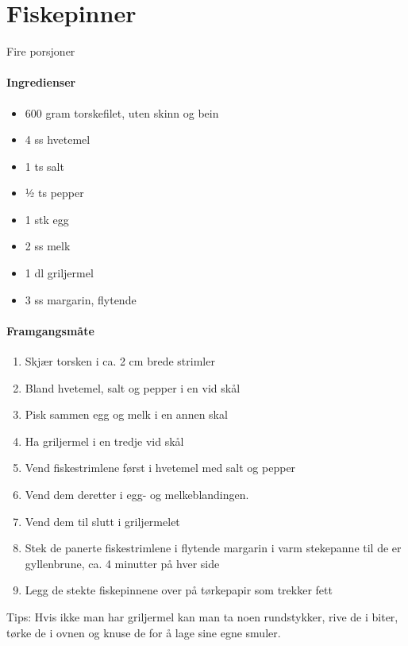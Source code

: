 \section{﻿Fiskepinner}
Fire porsjoner

\paragraph{Ingredienser}
\begin{itemize}[noitemsep]
	\item 600 gram  torskefilet, uten skinn og bein
	\item 4 ss hvetemel
	\item 1 ts salt
	\item ½ ts pepper
	\item 1 stk egg
	\item 2 ss melk
	\item 1 dl griljermel
	\item 3 ss margarin, flytende
\end{itemize}


\paragraph{Framgangsmåte}
\begin{enumerate}[noitemsep]
	\item Skjær torsken i ca. 2 cm brede strimler
	\item Bland hvetemel, salt og pepper i en vid skål
	\item Pisk sammen egg og melk i en annen skal
	\item Ha griljermel i en tredje vid skål
	\item Vend fiskestrimlene først i hvetemel med salt og pepper
	\item Vend dem deretter i egg- og melkeblandingen.
	\item Vend dem til slutt i griljermelet
	\item Stek de panerte fiskestrimlene i flytende margarin i varm stekepanne til de er gyllenbrune, ca. 4 minutter på hver side
	\item Legg de stekte fiskepinnene over på tørkepapir som trekker fett
\end{enumerate}

Tips: Hvis ikke man har griljermel kan man ta noen rundstykker, rive de i biter, tørke de i ovnen og knuse de for å lage sine egne smuler.
